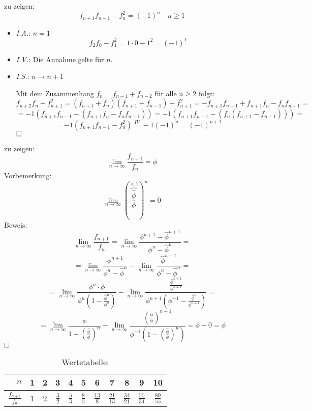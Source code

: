 \begin{flushenum}
\item
zu zeigen:
  \[ f_{n+1} f_{n-1} - f_n^2 = (-1)^n \quad n \geq 1 \]
  \begin{itemize}
    \item \textit{I.A.}: $n = 1$
      \[ f_2f_0 - f_1^2 = 1 \cdot 0 - 1^2 = (-1)^1 \]
    \item \textit{I.V.}: Die Annahme gelte für $n$.
    \item \textit{I.S.}: $n \rightarrow n + 1$

    Mit dem Zusammenhang $f_{n} = f_{n-1} + f_{n-2}$ für alle $n \geq 2$ folgt:
    \[ f_{n+2}f_n - f_{n+1}^2 = (f_{n+1} + f_n)(f_{n+1} - f_{n-1}) - f_{n+1}^2
                              = -f_{n+1}f_{n-1} + f_{n+1}f_n - f_nf_{n-1} = \]
    \[ = -1(f_{n+1}f_{n-1} - (f_{n+1}f_n - f_nf_{n-1})) 
       = -1(f_{n+1}f_{n-1} - (f_n(f_{n+1} - f_{n-1}))) = \]
    \[ = -1(f_{n+1}f_{n-1} - f_n^2) \overset{IV}{=} -1(-1)^n = (-1)^{n+1} \]
    $\hfill \square$
  \end{itemize}
\item
  zu zeigen:
  \[ \lim_{n \rightarrow \infty} \frac{f_{n+1}}{f_n} = \phi \]
  Vorbemerkung:
  \[ \lim_{n \rightarrow \infty} (\overbrace{\frac{\widehat{\phi}}{\phi}}^{< 1})^n = 0 \]
  Beweis:
  \[ \lim_{n \rightarrow \infty} \frac{f_{n+1}}{f_n} 
     = \lim_{n \rightarrow \infty} \frac{\phi^{n+1} - 
       \widehat{\phi}^{n+1}}{\phi^n - \widehat{\phi}^n} = \]
  \[ = \lim_{n \rightarrow \infty} \frac{\phi^{n+1}}{\phi^n - \widehat{\phi}^n} - 
       \lim_{n \rightarrow \infty} \frac{\widehat{\phi}^{n+1}}{\phi^n - \widehat{\phi}^n} = \]
  \[ = \lim_{n \rightarrow \infty} \frac{\phi^n \cdot \phi}{\phi^n (1 - \frac{\widehat{\phi}^n}{\phi^n})} - 
       \lim_{n \rightarrow \infty} \frac{\frac{\widehat{\phi}^{n+1}}{\phi^{n+1}}}
                                        {\phi^{n+1}(\phi^{-1} - \frac{\widehat{\phi}^n}{\phi^{n+1}})} = \]
  \[ = \lim_{n \rightarrow \infty} \frac{\phi}{1 - (\frac{\widehat{\phi}}{\phi})^n} - 
       \lim_{n \rightarrow \infty} \frac{(\frac{\widehat{\phi}}{\phi})^{n+1}}
                                        {\phi^{-1} (1 - (\frac{\widehat{\phi}}{\phi})^n)}
     = \phi - 0 = \phi \] $\hfill \square$
  \begin{table}[h!b!p!]
  \caption{Wertetabelle:}
  \begin{center}
  \begin{tabular}{r|cccccccccc}
  $n$                   & 1  &  2  &  3  &  4  &  5  &  6  &  7  &  8  &  9  & 10 \\
  \hline
  $\frac{f_{n+1}}{f_n}$ & 1  &  2  & $\frac{3}{2}$ & $\frac{5}{3}$ & $\frac{8}{5}$ & $\frac{13}{8}$ & $\frac{21}{13}$ & $\frac{34}{21}$ & $\frac{55}{34}$ & $\frac{89}{55}$
  \end{tabular}
  \end{center}
  \end{table}


\end{flushenum}
